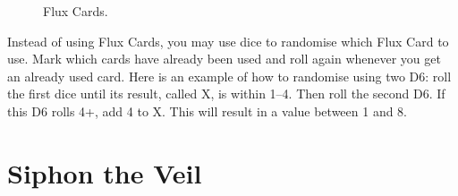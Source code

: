 \begin{figure}[!htbp]
	\def\FluxCardTitle{\Largefontsize\textbf{Flux Card 5}}
	\def\FluxCardDice{%
	\textbf{5 Magic Dice}\par
	(both players)}
	\def\FluxCardVeil{\textbf{9 Veil Tokens}\par
	(Active Player)}
	\def\FluxCardMiscast{}
	\def\svgwidth{\fluxcardwidth}
	
	\hspace{\fluxcardgap}
	\def\FluxCardTitle{\Largefontsize\textbf{Flux Card 6}}
	\def\FluxCardDice{%
	\textbf{6 Magic Dice}\par
	(both players)}
	\def\FluxCardVeil{\textbf{5 Veil Tokens}\par
	(Active Player)}
	\def\FluxCardMiscast{}
	\def\svgwidth{\fluxcardwidth}
	
	\hspace{\fluxcardgap}
	\def\FluxCardTitle{\Largefontsize\textbf{Flux Card 7}}
	\def\FluxCardDice{%
	\textbf{6 Magic Dice}\par
	(both players)}
	\def\FluxCardVeil{\textbf{7 Veil Tokens}\par
	(Active Player)}
	\def\FluxCardMiscast{}
	\def\svgwidth{\fluxcardwidth}
	
	\hspace{\fluxcardgap}
	\def\FluxCardTitle{\Largefontsize\textbf{Flux Card 8}}
	\def\FluxCardDice{%
	\textbf{7 Magic Dice}\par
	(both players)}
	\def\FluxCardVeil{\textbf{7 Veil Tokens}\par
	(Active Player)}
	\def\FluxCardMiscast{\normalfontsize All Miscasts this phase suffer a \textbf{−1} Miscast Modifier}
	\def\svgwidth{\fluxcardwidth}
	
	
	\caption{Flux Cards.}
	\label{figure/flux_cards}
\end{figure}

Instead of using Flux Cards, you may use dice to randomise which Flux Card to use. Mark which cards have already been used and roll again whenever you get an already used card. Here is an example of how to randomise using two D6: roll the first dice until its result, called X, is within 1--4. Then roll the second D6. If this D6 rolls 4+, add 4 to X. This will result in a value between 1 and 8.

\newpage
\section{Siphon the Veil}
\label{siphon_the_veil}

